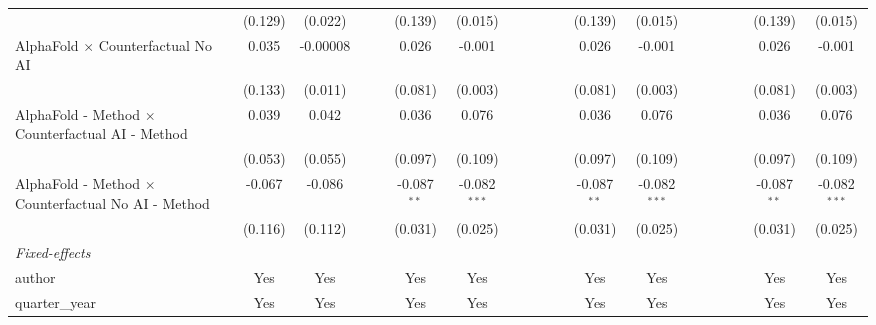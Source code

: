 \begin{tabular}{lcccccccccccccccccc}
                                                              & (0.129) & (0.022)  &     &     & (0.139)       & (0.015)        &     &     &     &      & (0.139)       & (0.015)        &      &      &      &      & (0.139)       & (0.015)\\   
   AlphaFold $\times$ Counterfactual No AI                    & 0.035   & -0.00008 &     &     & 0.026         & -0.001         &     &     &     &      & 0.026         & -0.001         &      &      &      &      & 0.026         & -0.001\\   
                                                              & (0.133) & (0.011)  &     &     & (0.081)       & (0.003)        &     &     &     &      & (0.081)       & (0.003)        &      &      &      &      & (0.081)       & (0.003)\\   
   AlphaFold - Method $\times$ Counterfactual AI - Method     & 0.039   & 0.042    &     &     & 0.036         & 0.076          &     &     &     &      & 0.036         & 0.076          &      &      &      &      & 0.036         & 0.076\\   
                                                              & (0.053) & (0.055)  &     &     & (0.097)       & (0.109)        &     &     &     &      & (0.097)       & (0.109)        &      &      &      &      & (0.097)       & (0.109)\\   
   AlphaFold - Method $\times$ Counterfactual No AI - Method  & -0.067  & -0.086   &     &     & -0.087$^{**}$ & -0.082$^{***}$ &     &     &     &      & -0.087$^{**}$ & -0.082$^{***}$ &      &      &      &      & -0.087$^{**}$ & -0.082$^{***}$\\   
                                                              & (0.116) & (0.112)  &     &     & (0.031)       & (0.025)        &     &     &     &      & (0.031)       & (0.025)        &      &      &      &      & (0.031)       & (0.025)\\   
   \midrule
   \emph{Fixed-effects}\\
   author                                                     & Yes     & Yes      &     &     & Yes           & Yes            &     &     &     &      & Yes           & Yes            &      &      &      &      & Yes           & Yes\\  
   quarter\_year                                              & Yes     & Yes      &     &     & Yes           & Yes            &     &     &     &      & Yes           & Yes            &      &      &      &      & Yes           & Yes\\  

\end{tabular}
